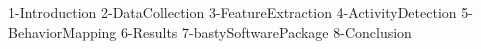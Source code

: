 \documentclass[12pt, leqno, oneside, a4paper]{book}
\begin{document}
{1-Introduction}
{2-DataCollection}
{3-FeatureExtraction}
{4-ActivityDetection}
{5-BehaviorMapping}
{6-Results}
{7-bastySoftwarePackage}
{8-Conclusion}

\renewcommand{\headrulewidth}{0.0pt}
\renewcommand{\footrulewidth}{0.0pt}
\rhead[]{}
\chead[]{}
\lhead[]{}
\lfoot[]{}
\cfoot[]{\thepage}
\rfoot[]{}

\clearpage \pagebreak \singlespace \normalsize
{}

\end{document}
